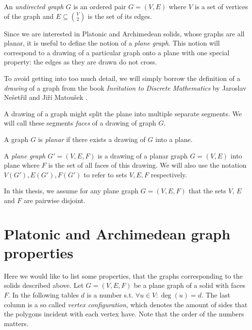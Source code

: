 \begin{defn}
    An \emph{undirected graph} $G$ is an ordered pair $G=(V,E)$ where $V$ is a set of vertices of the graph and $E \subseteq \binom{V}{2}$ is the set of its edges. 
\end{defn}

Since we are interested in Platonic and Archimedean solids, whose graphs are all planar, it is useful to define the notion of a \textit{plane graph}. This notion will correspond to a drawing of a particular graph onto a plane with one special property: the edges as they are drawn do not cross. 

\begin{highlight}
To avoid getting into too much detail, we will simply borrow the definition of a \textit{drawing} of a graph from the book \textit{Invitation to Discrete Mathematics} by Jaroslav Nešetřil and Jiří Matoušek \cite{matousek2009}.

\end{highlight}

A drawing of a graph might split the plane into multiple separate segments. We will call these segments \textit{faces} of a drawing of graph $G$.

\begin{defn}
    A graph $G$ is \emph{planar} if there exists a drawing of $G$ into a plane.
\end{defn}

\begin{defn}
    A \emph{plane graph} $G' = (V,E,F)$ is a drawing of a planar graph $G=(V,E)$ into plane where $F$ is the set of all faces of this drawing. We will also use the notation $V(G'), E(G'), F(G')$ to refer to sets $V,E,F$ respectively.
\end{defn}

In this thesis, we assume for any plane graph $G=(V,E,F)$ that the sets $V$, $E$ and $F$ are pairwise disjoint.


\section{Platonic and Archimedean graph properties}

\begin{highlight}
Here we would like to list some properties, that the graphs corresponding to the solids described above. Let $G=(V,E,F)$ be a plane graph of a solid with faces $F$. In the following tables $d$ is a number s.t. $\forall u \in V : \deg(u) = d$. The last column is a so called \textit{vertex configuration}, which denotes the amount of sides that the polygons incident with each vertex have. Note that the order of the numbers matters.
\end{highlight}

